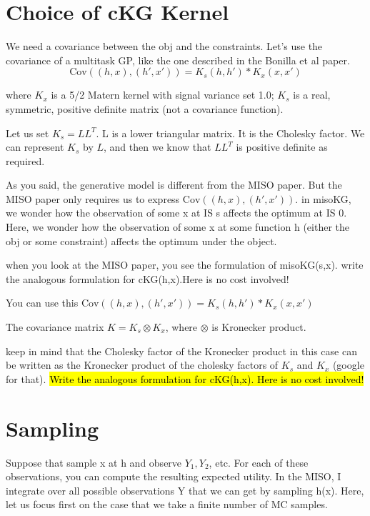 \documentclass[12pt]{article}
\begin{document}
\section{Choice of cKG Kernel}
We need a covariance between the obj and the constraints. Let's use the covariance of a multitask GP, like the one described in the Bonilla et al paper.
\begin{equation*}
\text{Cov}( (h,x), (h',x') ) = K_s(h,h') * K_x(x,x')
\end{equation*}

where $K_x$ is a 5/2 Matern kernel with signal variance set 1.0; $K_s$ is a real, symmetric, positive definite matrix (not a covariance function).

Let us set $K_s = L L^T$. L is a lower triangular matrix. It is the Cholesky factor.
We can represent $K_s$ by $L$, and then we know that $L L^T$ is positive definite as required.

As you said, the generative model is different from the MISO paper. But the MISO paper only requires us to express $\text{Cov}( (h,x), (h',x') )$. in misoKG, we wonder how the observation of some x at IS s affects the optimum at IS 0. Here, we wonder how the observation of some x at some function h (either the obj or some constraint) affects the optimum under the object.

when you look at the MISO paper, you see the formulation of misoKG(s,x). write the analogous formulation for cKG(h,x).Here is no cost involved!

You can use this $\text{Cov}( (h,x), (h',x') ) = K_s(h,h') * K_x(x,x')$

The covariance matrix $ K = K_s \otimes K_x$, where $\otimes$ is Kronecker product.

keep in mind that the Cholesky factor of the Kronecker product in this case can be written as the Kronecker product of the cholesky factors of $K_s$ and $K_x$ (google for that).\hl{ Write the analogous formulation for cKG(h,x). Here is no cost involved!}

\section{Sampling}

Suppose that sample x at h and observe $Y_1, Y_2$, etc. For each of these observations, you can compute the resulting expected utility. In the MISO, I integrate over all possible observations Y that we can get by sampling h(x). Here, let us focus first on the case that we take a finite number of MC samples.
\end{document}
